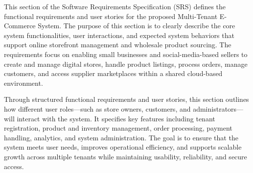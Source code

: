 This section of the Software Requirements Specification (SRS) defines the functional requirements and user stories for the proposed Multi-Tenant E-Commerce System. The purpose of this section is to clearly describe the core system functionalities, user interactions, and expected system behaviors that support online storefront management and wholesale product sourcing. The requirements focus on enabling small businesses and social-media-based sellers to create and manage digital stores, handle product listings, process orders, manage customers, and access supplier marketplaces within a shared cloud-based environment.

Through structured functional requirements and user stories, this section outlines how different user roles—such as store owners, customers, and administrators—will interact with the system. It specifies key features including tenant registration, product and inventory management, order processing, payment handling, analytics, and system administration. The goal is to ensure that the system meets user needs, improves operational efficiency, and supports scalable growth across multiple tenants while maintaining usability, reliability, and secure access.